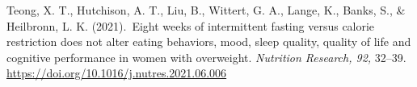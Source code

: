 \documentclass[authordate, empirical,issue]{jote-new-article}
\begin{document}









Teong, X. T., Hutchison, A. T., Liu, B., Wittert, G. A., Lange, K., Banks, S., \& Heilbronn, L. K. (2021). Eight weeks of intermittent fasting versus calorie restriction does not alter eating behaviors, mood, sleep quality, quality of life and cognitive performance in women with overweight. \emph{Nutrition Research, 92, }32--39. \url{https://doi.org/10.1016/j.nutres.2021.06.006}









\end{document}
